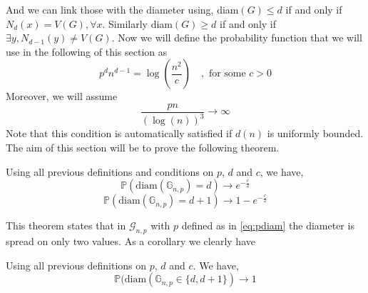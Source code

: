 And we can link those with the diameter using, diam$(G) \leq d $ if and only if $N_d(x) = V(G), \forall x$.
\newline
Similarly diam$(G) \geq d $ if and only if $\exists y, N_{d-1}(y) \neq V(G)$.
\newline
Now we will define the probability function that we will use in the following of this section as 
\begin{equation} \label{eq:pdiam}
	p^d n^{d-1} = \log(\frac{n^2}{c}) \quad, \text{  for some } c >0
\end{equation}
Moreover, we will assume
\begin{equation}\label{eq:logtrois}
	\frac{pn}{(\log(n))^3} \longrightarrow \infty
\end{equation}
Note that this condition is automatically satisfied if $d(n)$ is uniformly bounded.
The aim of this section will be to prove the following theorem.
\begin{theorem}\label{th:diam2}
	Using all previous definitions and conditions on $p$, $d$ and $c$, we have,
	\begin{equation}
		\mathbb{P}(\text{diam}(\mathbb{G}_{n, p}) = d) \longrightarrow e^{-\frac{c}{2}}
	\end{equation}	
	\begin{equation}
		\mathbb{P}(\text{diam}(\mathbb{G}_{n,p}) = d + 1) \longrightarrow 1 - e^{-\frac{c}{2}}
	\end{equation}
\end{theorem}
This theorem states that in $\mathcal{G}_{n,p}$ with $p$ defined as in \eqref{eq:pdiam} the diameter is spread on only two values.
As a corollary we clearly have
\begin{corollary}
	Using all previous definitions on $p$, $d$ and $c$. We have,
	\begin{equation}
		\mathbb{P}(\text{diam}(\mathbb{G}_{n,p} \in \{d, d+1\}) \longrightarrow 1
	\end{equation}
\end{corollary}

